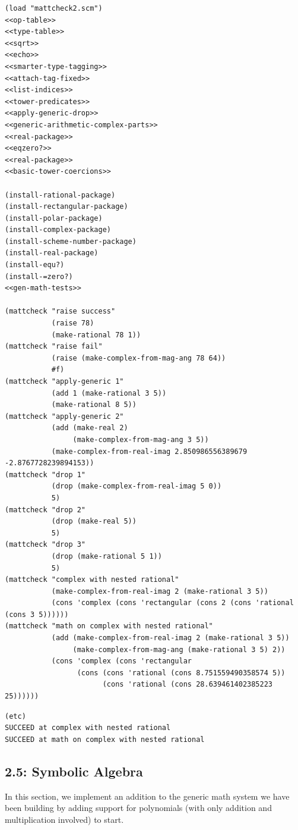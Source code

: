 \documentclass[final,fleqn,titlepage,twoside]{article}
\begin{document}
\begin{verbatim}
(load "mattcheck2.scm")
<<op-table>>
<<type-table>>
<<sqrt>>
<<echo>>
<<smarter-type-tagging>>
<<attach-tag-fixed>>
<<list-indices>>
<<tower-predicates>>
<<apply-generic-drop>>
<<generic-arithmetic-complex-parts>>
<<real-package>>
<<eqzero?>>
<<real-package>>
<<basic-tower-coercions>>

(install-rational-package)
(install-rectangular-package)
(install-polar-package)
(install-complex-package)
(install-scheme-number-package)
(install-real-package)
(install-equ?)
(install-=zero?)
<<gen-math-tests>>

(mattcheck "raise success"
           (raise 78)
           (make-rational 78 1))
(mattcheck "raise fail"
           (raise (make-complex-from-mag-ang 78 64))
           #f)
(mattcheck "apply-generic 1"
           (add 1 (make-rational 3 5))
           (make-rational 8 5))
(mattcheck "apply-generic 2"
           (add (make-real 2)
                (make-complex-from-mag-ang 3 5))
           (make-complex-from-real-imag 2.850986556389679 -2.8767728239894153))
(mattcheck "drop 1"
           (drop (make-complex-from-real-imag 5 0))
           5)
(mattcheck "drop 2"
           (drop (make-real 5))
           5)
(mattcheck "drop 3"
           (drop (make-rational 5 1))
           5)
(mattcheck "complex with nested rational"
           (make-complex-from-real-imag 2 (make-rational 3 5))
           (cons 'complex (cons 'rectangular (cons 2 (cons 'rational (cons 3 5))))))
(mattcheck "math on complex with nested rational"
           (add (make-complex-from-real-imag 2 (make-rational 3 5))
                (make-complex-from-mag-ang (make-rational 3 5) 2))
           (cons 'complex (cons 'rectangular
                 (cons (cons 'rational (cons 8.751559490358574 5))
                       (cons 'rational (cons 28.639461402385223 25))))))
\end{verbatim}

\begin{verbatim}
(etc)
SUCCEED at complex with nested rational
SUCCEED at math on complex with nested rational
\end{verbatim}

\subsection{2.5: Symbolic Algebra}
\label{sec:org2b78294}
In this section, we implement an addition to the generic math system we have
been building by adding support for polynomials (with only addition and
multiplication involved) to start.
\end{document}
